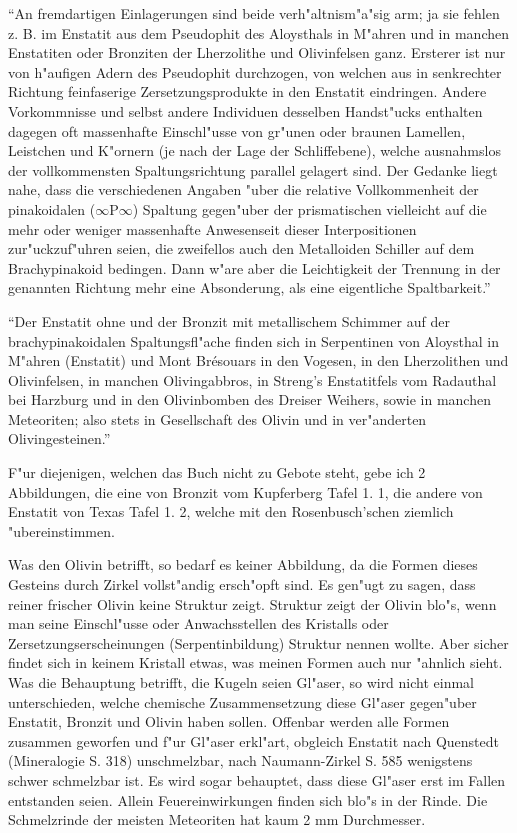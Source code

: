 \documentclass[a4paper, 11pt, oneside]{article}
\begin{document}
"`An fremdartigen Einlagerungen sind beide verh"altnism"a"sig arm; ja sie fehlen z. B. im Enstatit aus dem Pseudophit des Aloysthals in M"ahren und in manchen Enstatiten oder Bronziten der Lherzolithe und Olivinfelsen ganz. Ersterer ist nur von h"aufigen Adern des Pseudophit durchzogen, von welchen aus in senkrechter Richtung feinfaserige Zersetzungsprodukte in den Enstatit eindringen. Andere Vorkommnisse und selbst andere Individuen desselben Handst"ucks enthalten dagegen oft massenhafte Einschl"usse von gr"unen oder braunen Lamellen, Leistchen und K"ornern (je nach der Lage der Schliffebene), welche ausnahmslos der vollkommensten Spaltungsrichtung parallel gelagert sind. Der Gedanke liegt nahe, dass die verschiedenen Angaben "uber die relative Vollkommenheit der pinakoidalen ($\infty$P$\infty$) Spaltung gegen"uber der prismatischen vielleicht auf die mehr oder weniger massenhafte Anwesenseit dieser Interpositionen zur"uckzuf"uhren seien, die zweifellos auch den Metalloiden Schiller auf dem Brachypinakoid bedingen. Dann w"are aber die Leichtigkeit der Trennung in der genannten Richtung mehr eine Absonderung, als eine eigentliche Spaltbarkeit."'

"`Der Enstatit ohne und der Bronzit mit metallischem Schimmer auf der brachypinakoidalen Spaltungsfl"ache finden sich in Serpentinen von Aloysthal in M"ahren (Enstatit) und Mont Brésouars in den Vogesen, in den Lherzolithen und Olivinfelsen, in manchen Olivingabbros, in Streng's Enstatitfels vom Radauthal bei Harzburg und in den Olivinbomben des Dreiser Weihers, sowie in manchen Meteoriten; also stets in Gesellschaft des Olivin und in ver"anderten Olivingesteinen."'

F"ur diejenigen, welchen das Buch nicht zu Gebote steht, gebe ich 2 Abbildungen, die eine von Bronzit vom Kupferberg Tafel 1. 1, die andere von Enstatit von Texas Tafel 1. 2, welche mit den Rosenbusch'schen ziemlich "ubereinstimmen.

Was den Olivin betrifft, so bedarf es keiner Abbildung, da die Formen dieses Gesteins durch Zirkel vollst"andig ersch"opft sind. Es gen"ugt zu sagen, dass reiner frischer Olivin keine Struktur zeigt. Struktur zeigt der Olivin blo"s, wenn man seine Einschl"usse oder Anwachsstellen des Kristalls oder Zersetzungserscheinungen (Serpentinbildung) Struktur nennen wollte. Aber sicher findet sich in keinem Kristall etwas, was meinen Formen auch nur "ahnlich sieht. Was die Behauptung betrifft, die Kugeln seien Gl"aser, so wird nicht einmal unterschieden, welche chemische Zusammensetzung diese Gl"aser gegen"uber Enstatit, Bronzit und Olivin haben sollen. Offenbar werden alle Formen zusammen geworfen und f"ur Gl"aser erkl"art, obgleich Enstatit nach Quenstedt (Mineralogie S. 318) unschmelzbar, nach Naumann-Zirkel S. 585 wenigstens schwer schmelzbar ist. Es wird sogar behauptet, dass diese Gl"aser erst im Fallen entstanden seien. Allein Feuereinwirkungen finden sich blo"s in der Rinde. Die Schmelzrinde der meisten Meteoriten hat kaum 2 mm Durchmesser.
\end{document}
